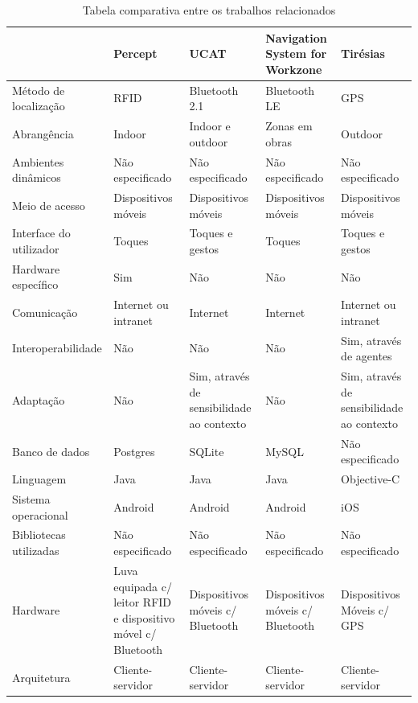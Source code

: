 \documentclass[twoside,english,brazilian]{UNISINOSartigo}
\begin{document}
\FloatBarrier
\begin{table}
	\caption{Tabela comparativa entre os trabalhos relacionados}
	\label{tab:trabalalhosRelacionados}
	\centering%
	\begin{minipage}{0.9\textwidth}
		\begin{adjustbox}{max width=\textwidth}
		\begin{tabular}{ p{3cm} | p{3cm} | p{3cm} | p{3cm} | p{3cm} }
 	\hline
 	& \textbf{Percept} & \textbf{UCAT} & \textbf{Navigation System for Workzone} & \textbf{Tirésias} \\ \hline
	Método de localização & RFID & Bluetooth 2.1 & Bluetooth LE & GPS \\ \hline
	Abrangência & Indoor & Indoor e outdoor & Zonas em obras & Outdoor \\ \hline
	Ambientes dinâmicos & Não especificado & Não especificado & Não especificado & Não especificado \\ \hline
	Meio de acesso & Dispositivos móveis & Dispositivos móveis & Dispositivos móveis & Dispositivos móveis \\ \hline
	Interface do utilizador & Toques & Toques e gestos & Toques & Toques e gestos \\ \hline
	Hardware específico & Sim & Não & Não & Não \\ \hline
	Comunicação & Internet ou intranet & Internet & Internet & Internet ou intranet \\ \hline
	Interoperabilidade & Não & Não & Não & Sim, através de agentes \\ \hline
	Adaptação & Não & Sim, através de sensibilidade ao contexto & Não & Sim, através de sensibilidade ao contexto \\ \hline
	Banco de dados & Postgres & SQLite & MySQL & Não especificado \\ \hline
	Linguagem & Java & Java & Java & Objective-C \\ \hline
	Sistema operacional & Android & Android & Android & iOS \\ \hline
	Bibliotecas utilizadas & Não especificado & Não especificado & Não especificado & Não especificado \\ \hline
	Hardware & Luva equipada c/ leitor RFID e dispositivo móvel c/ Bluetooth & Dispositivos móveis c/ Bluetooth & Dispositivos móveis c/ Bluetooth & Dispositivos Móveis c/ GPS \\ \hline
	Arquitetura & Cliente-servidor & Cliente-servidor & Cliente-servidor & Cliente-servidor \\ \hline
		\end{tabular}
		\end{adjustbox}
	\end{minipage}
\end{table}
\end{document}
